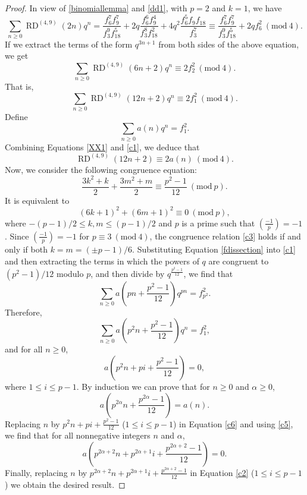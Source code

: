 \documentclass[12pt]{amsart}
\DeclareMathOperator {\myRD}{RD}
\theoremstyle{plain}
\theoremstyle{definition}
\begin{document}
\begin{proof} 
In view of \eqref{binomiallemma} and \eqref{dd1}, with $p=2$ and $k=1$, we have
\[
    \sum_{n\geq 0} \myRD^{(4, 9)}(2n) q^{n}=\dfrac{f_{6}^{7}f_{9}^{7}}{f_{3}^{9}f_{18}^{5}}+2q\dfrac{f_{6}^{6}f_{9}^{4}}{f_{3}^{8}f_{18}^{2}}+4q^{2}\dfrac{f_{6}^{5}f_{9}f_{18}}{f_{3}^{7}} \equiv \dfrac{f_{6}^{7}f_{9}^{7}}{f_{3}^{9}f_{18}^{5}}+2qf_{6}^{2} \ (\mathrm{mod} \ 4).
\]
If we extract the terms of the form $q^{3n+1}$ from both sides of the above equation, we get
\[
\sum_{n\geq 0} \myRD^{(4, 9)}(6n+2) q^{n} \equiv 2f_{2}^{2} \ (\mathrm{mod} \ 4).
\]
That is,
\begin{equation}
    \sum_{n\geq 0} \myRD^{(4, 9)}(12n+2) q^{n} \equiv 2f_{1}^{2} \ (\mathrm{mod} \ 4). \label{XX1}
\end{equation}
Define
\begin{equation} 
\sum_{n\geq 0} a(n)q^{n} = f_{1}^{2}. \label{c1}
\end{equation}
Combining Equations \eqref{XX1} and \eqref{c1}, we deduce that
\begin{equation}
\myRD^{(4, 9)}(12n+2) \equiv  2a(n) \ (\mathrm{mod} \ 4). \label{c2}
\end{equation}
Now, we consider the following congruence equation:
\[
\frac{3k^{2}+k}{2}+\frac{3m^{2}+m}{2} \equiv \frac{p^{2}-1}{12} \ (\mathrm{mod} \ p).
\]
It is equivalent to
\begin{equation}
(6k+1)^{2}+(6m+1)^{2} \equiv 0 \ (\mathrm{mod} \ p), \label{c3}
\end{equation}
where $-(p-1)/2 \leq k,m \leq (p-1)/2$ and $p$ is a prime such that $(\frac{-1}{p})=-1$. Since $(\frac{-1}{p})=-1$ for $p\equiv 3 \ (\mathrm{mod} \ 4)$, the congruence relation \eqref{c3} holds if and only if both $k=m=(\pm p-1)/6$. Substituting Equation \eqref{fdissection} into \eqref{c1} and then extracting the terms in which the powers of $q$ are congruent to $(p^{2}-1)/12$ modulo $p$, and then divide by $q^{\frac{p^{2}-1}{12}}$, we find that
\[
\sum_{n\geq 0} a\left(pn+\frac{p^{2}-1}{12}\right)q^{pn}=f_{p^{2}}^{2}.
\]
Therefore,
\begin{equation*}
\sum_{n\geq 0} a\left(p^{2}n+\frac{p^{2}-1}{12}\right) q^{n} =f_{1}^{2},  
\end{equation*}
and for all $n\geq 0$,
\begin{equation}
a \left(p^{2}n+pi+\frac{p^{2}-1}{12}\right)=0, \label{c5}
\end{equation}
where  $1\leq i \leq p-1$. By induction we can prove that for $n\geq 0$ and $\alpha\geq 0$,
\begin{equation}
a\left(p^{2\alpha}n+\frac{p^{2\alpha}-1}{12}\right)=a(n). \label{c6}
\end{equation}
Replacing $n$ by $p^{2}n+pi+\frac{p^{2}-1}{12}$ ($1\leq i \leq p-1$) in Equation \eqref{c6} and using \eqref{c5}, we find that for all nonnegative integers $n$ and $\alpha$,
\[
a \left(p^{2\alpha+2}n+p^{2\alpha+1}i+\frac{p^{2\alpha+2}-1}{12}\right)=0. 
\]
Finally, replacing $n$ by $p^{2\alpha+2}n+p^{2\alpha+1}i+\frac{p^{2\alpha+2}-1}{12}$ in Equation \eqref{c2} ($1\leq i \leq p-1$) we obtain the desired result.
\end{proof}
\end{document}
